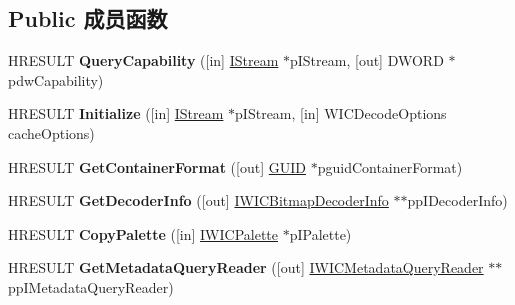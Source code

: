 \subsection*{Public 成员函数}
\begin{DoxyCompactItemize}
\item 
\mbox{\label{interface_i_w_i_c_bitmap_decoder_a93569d8327a5fe465c7554993cd215ab}} 
H\+R\+E\+S\+U\+LT {\bfseries Query\+Capability} (\mbox{[}in\mbox{]} \hyperlink{interface_i_stream}{I\+Stream} $\ast$p\+I\+Stream, \mbox{[}out\mbox{]} D\+W\+O\+RD $\ast$pdw\+Capability)
\item 
\mbox{\label{interface_i_w_i_c_bitmap_decoder_abfa9dfaca9474e6280195e7e48851227}} 
H\+R\+E\+S\+U\+LT {\bfseries Initialize} (\mbox{[}in\mbox{]} \hyperlink{interface_i_stream}{I\+Stream} $\ast$p\+I\+Stream, \mbox{[}in\mbox{]} W\+I\+C\+Decode\+Options cache\+Options)
\item 
\mbox{\label{interface_i_w_i_c_bitmap_decoder_a4a5f9cd8223ed7c12fc94dc50f00865b}} 
H\+R\+E\+S\+U\+LT {\bfseries Get\+Container\+Format} (\mbox{[}out\mbox{]} \hyperlink{interface_g_u_i_d}{G\+U\+ID} $\ast$pguid\+Container\+Format)
\item 
\mbox{\label{interface_i_w_i_c_bitmap_decoder_a85661d588ef2b13820a25a0dad1926f8}} 
H\+R\+E\+S\+U\+LT {\bfseries Get\+Decoder\+Info} (\mbox{[}out\mbox{]} \hyperlink{interface_i_w_i_c_bitmap_decoder_info}{I\+W\+I\+C\+Bitmap\+Decoder\+Info} $\ast$$\ast$pp\+I\+Decoder\+Info)
\item 
\mbox{\label{interface_i_w_i_c_bitmap_decoder_a053c1f5c1a8151c046593e535dfbf03e}} 
H\+R\+E\+S\+U\+LT {\bfseries Copy\+Palette} (\mbox{[}in\mbox{]} \hyperlink{interface_i_w_i_c_palette}{I\+W\+I\+C\+Palette} $\ast$p\+I\+Palette)
\item 
\mbox{\label{interface_i_w_i_c_bitmap_decoder_aa2c3a59140eb1bda306e20c785011090}} 
H\+R\+E\+S\+U\+LT {\bfseries Get\+Metadata\+Query\+Reader} (\mbox{[}out\mbox{]} \hyperlink{interface_i_w_i_c_metadata_query_reader}{I\+W\+I\+C\+Metadata\+Query\+Reader} $\ast$$\ast$pp\+I\+Metadata\+Query\+Reader)
\item 

\end{DoxyCompactItemize}

